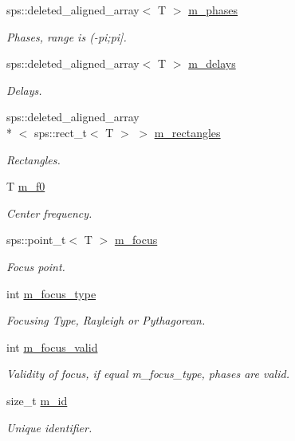 \begin{DoxyCompactItemize}
sps\+::deleted\+\_\+aligned\+\_\+array$<$ T $>$ \hyperlink{singletonfnm_1_1ApertureData_a2939401ddbdafbc9797a8ac8f2a2bda1}{m\+\_\+phases}
\begin{DoxyCompactList}\small\item\em Phases, range is (-\/pi;pi\mbox{]}. \end{DoxyCompactList}\item 
sps\+::deleted\+\_\+aligned\+\_\+array$<$ T $>$ \hyperlink{singletonfnm_1_1ApertureData_ac769b07e6f634757ef28e556a1a47dc2}{m\+\_\+delays}
\begin{DoxyCompactList}\small\item\em Delays. \end{DoxyCompactList}\item 
sps\+::deleted\+\_\+aligned\+\_\+array\\*
$<$ sps\+::rect\+\_\+t$<$ T $>$ $>$ \hyperlink{singletonfnm_1_1ApertureData_a95dab395f62c1f3c1243d645a5179d4d}{m\+\_\+rectangles}
\begin{DoxyCompactList}\small\item\em Rectangles. \end{DoxyCompactList}\item 
T \hyperlink{singletonfnm_1_1ApertureData_a628c4a5cd9324cca318c700cf441b9c8}{m\+\_\+f0}
\begin{DoxyCompactList}\small\item\em Center frequency. \end{DoxyCompactList}\item 
sps\+::point\+\_\+t$<$ T $>$ \hyperlink{singletonfnm_1_1ApertureData_abbeae260606697441a45507f847876ef}{m\+\_\+focus}
\begin{DoxyCompactList}\small\item\em Focus point. \end{DoxyCompactList}\item 
int \hyperlink{singletonfnm_1_1ApertureData_a6fed2f515d85db14127cadaa8ebe014b}{m\+\_\+focus\+\_\+type}
\begin{DoxyCompactList}\small\item\em Focusing Type, Rayleigh or Pythagorean. \end{DoxyCompactList}\end{DoxyCompactItemize}
{\bf }\par
\begin{DoxyCompactItemize}
\item 
int \hyperlink{singletonfnm_1_1ApertureData_a93049b6e21b2069a9fe41469c3705cf4}{m\+\_\+focus\+\_\+valid}
\begin{DoxyCompactList}\small\item\em Validity of focus, if equal m\+\_\+focus\+\_\+type, phases are valid. \end{DoxyCompactList}\item 
size\+\_\+t \hyperlink{singletonfnm_1_1ApertureData_ad7c4acb1bca84f83f3072e0a9888818b}{m\+\_\+id}
\begin{DoxyCompactList}\small\item\em Unique identifier. \end{DoxyCompactList}\end{DoxyCompactItemize}

